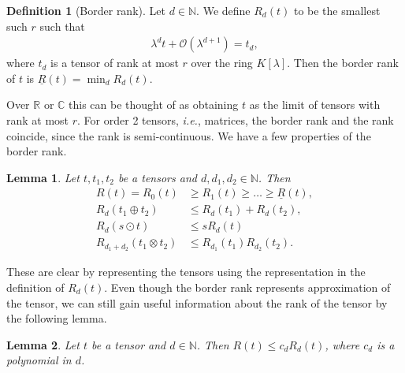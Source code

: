 \documentclass{article}
\newcommand{\N}{\mathbb{N}}
\newcommand{\R}{\mathbb{R}}
\newcommand{\C}{\mathbb{C}}
\theoremstyle{plain}
\newtheorem{lemma}{Lemma}
\theoremstyle{definition}
\newtheorem{definition}{Definition}
\theoremstyle{remark}
\begin{document}
\begin{definition}[Border rank]
Let $d \in \N$. We define $R_d(t)$ to be the smallest such $r$ such that
\begin{align*}
    \lambda^d t + \mathcal{O}(\lambda^{d+1}) = t_d,
\end{align*}
where $t_d$ is a tensor of rank at most $r$ over the ring $K[\lambda]$. Then the border rank of $t$ is $\underline{R}(t) = \min_d R_d(t)$.
\end{definition}

Over $\R$ or $\C$ this can be thought of as obtaining $t$ as the limit of tensors with rank at most $r$. For order 2 tensors, \emph{i.e.}, matrices, the border rank and the rank coincide, since the rank is semi-continuous. We have a few properties of the border rank.

\begin{lemma}\label{lem:border_rank_properties}
Let $t, t_1, t_2$ be a tensors and $d, d_1, d_2 \in \N$. Then
\begin{align*}
    R(t) = R_0(t) &\geq R_1(t) \geq \dots \geq \underline{R}(t), \\
    R_d(t_1 \oplus t_2) &\leq R_d(t_1) + R_d(t_2), \\
    R_d(s \odot t) &\leq s R_d(t) \\
    R_{d_1 + d_2}(t_1 \otimes t_2) &\leq R_{d_1}(t_1)R_{d_2}(t_2).
\end{align*}
\end{lemma}

These are clear by representing the tensors using the representation in the definition of $R_d(t)$. Even though the border rank represents approximation of the tensor, we can still gain useful information about the rank of the tensor by the following lemma.

\begin{lemma}\label{lem:rank_border_rank}
Let $t$ be a tensor and $d \in \N$. Then $R(t) \leq c_d R_d(t)$, where $c_d$ is a polynomial in $d$.
\end{lemma}
\end{document}
